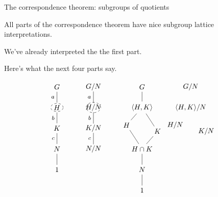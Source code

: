 \documentclass[8pt, handout]{beamer}
\newcommand{\Pause}{}      %
\begin{document}
\begin{frame}{The correspondence theorem: subgroups of quotients} 
  
  All parts of the correspondence theorem have nice subgroup lattice
  interpretations. \medskip\Pause
  
  We've already interpreted the the first part. \medskip\Pause
  
  Here's what the next four parts say.

  \[
  \begin{tikzpicture}[scale=.6]
    \begin{scope}[shift={(0,0)},scale=1.7]
      \node (G) at (0,4) {$G$};
      \node (H) at (0,3) {$H$};
      \node (K) at (0,2) {$K$};
      \node (N) at (0,1) {$N$};
      \node (1) at (0,0) {$1$};
      \draw[dashed] (H) circle [x radius=.3cm, y radius=.2cm];
      \draw (G) -- (H) node[left,pos=.5] {\footnotesize $a$}; 
      \draw (H) -- (K) node[left,pos=.5] {\footnotesize $b$};
      \draw (K) -- (N) node[left,pos=.5] {\footnotesize $c$};  
      \draw (N) to (1);
    \end{scope}
    \begin{scope}[shift={(3,0)},scale=1.7,shorten >= -2pt, shorten <= -2pt]
      \node (G/N) at (0,4) {$G/N$};
      \node (H/N) at (0,3) {$H/N$};
      \node (K/N) at (0,2) {$K/N$};
      \node (N/N) at (0,1) {$N/N$};
      \draw[dashed] (H/N) circle [x radius=.35cm, y radius=.25cm];
      \draw (G/N) -- (H/N) node[left,pos=.5] {\footnotesize $a$}; 
      \draw (H/N) -- (K/N) node[left,pos=.5] {\footnotesize $b$};
      \draw (K/N) -- (N/N) node[left,pos=.5] {\footnotesize $c$}; 
    \end{scope}
    \begin{scope}[shift={(7,0)},scale=1.7]
      \node (G) at (0,4) {$G$};
      \node (HcupK) at (0,3) {$\<H,K\>$};
      \node (H) at (-.75,2.15) {$H$};
      \node (K) at (.75,1.85) {$K$};
      \node (HcapK) at (0,1) {$H\cap K$};
      \node (N) at (0,0) {$N$};
      \node (1) at (0,-1) {$1$};
      \draw (G) -- (HcupK);
      \draw (HcupK) -- (H); \draw (HcupK) -- (K);
      \draw (HcapK) -- (H); \draw (HcapK) -- (K);
      \draw (HcapK) -- (N);
      \draw (N) -- (1);
    \end{scope}
    \begin{scope}[shift={(11,0)},scale=1.7]
      \node (G/N) at (0,4) {$G/N$};
      \node (HcupK/N) at (0,3) {$\<H,K\>/N$};
      \node (H/N) at (-.75,2.15) {$H/N$};
      \node (K/N) at (.75,1.85) {$K/N$};

\end{scope}
\end{tikzpicture}\]
\end{frame}
\end{document}
